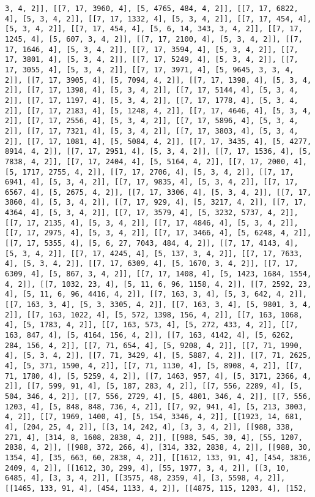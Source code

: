 \documentclass[12pt,fleqn]{article}\usepackage{../../common}
\begin{document}
\begin{verbatim}
3, 4, 2]], [[7, 17, 3960, 4], [5, 4765, 484, 4, 2]], [[7, 17, 6822, 4], [5, 3, 4, 2]], [[7, 17, 1332, 4], [5, 3, 4, 2]], [[7, 17, 454, 4], [5, 3, 4, 2]], [[7, 17, 454, 4], [5, 6, 14, 343, 3, 4, 2]], [[7, 17, 1245, 4], [5, 607, 3, 4, 2]], [[7, 17, 2100, 4], [5, 3, 4, 2]], [[7, 17, 1646, 4], [5, 3, 4, 2]], [[7, 17, 3594, 4], [5, 3, 4, 2]], [[7, 17, 3801, 4], [5, 3, 4, 2]], [[7, 17, 5249, 4], [5, 3, 4, 2]], [[7, 17, 3055, 4], [5, 3, 4, 2]], [[7, 17, 3971, 4], [5, 9645, 3, 3, 4, 2]], [[7, 17, 3905, 4], [5, 7094, 4, 2]], [[7, 17, 1398, 4], [5, 3, 4, 2]], [[7, 17, 1398, 4], [5, 3, 4, 2]], [[7, 17, 5144, 4], [5, 3, 4, 2]], [[7, 17, 1197, 4], [5, 3, 4, 2]], [[7, 17, 1778, 4], [5, 3, 4, 2]], [[7, 17, 2183, 4], [5, 1248, 4, 2]], [[7, 17, 4646, 4], [5, 3, 4, 2]], [[7, 17, 2556, 4], [5, 3, 4, 2]], [[7, 17, 5896, 4], [5, 3, 4, 2]], [[7, 17, 7321, 4], [5, 3, 4, 2]], [[7, 17, 3803, 4], [5, 3, 4, 2]], [[7, 17, 1081, 4], [5, 5084, 4, 2]], [[7, 17, 3435, 4], [5, 4277, 8914, 4, 2]], [[7, 17, 2951, 4], [5, 3, 4, 2]], [[7, 17, 1536, 4], [5, 7838, 4, 2]], [[7, 17, 2404, 4], [5, 5164, 4, 2]], [[7, 17, 2000, 4], [5, 1717, 2755, 4, 2]], [[7, 17, 2706, 4], [5, 3, 4, 2]], [[7, 17, 6941, 4], [5, 3, 4, 2]], [[7, 17, 9835, 4], [5, 3, 4, 2]], [[7, 17, 6567, 4], [5, 2675, 4, 2]], [[7, 17, 3306, 4], [5, 3, 4, 2]], [[7, 17, 3860, 4], [5, 3, 4, 2]], [[7, 17, 929, 4], [5, 3217, 4, 2]], [[7, 17, 4364, 4], [5, 3, 4, 2]], [[7, 17, 3579, 4], [5, 3232, 5737, 4, 2]], [[7, 17, 2135, 4], [5, 3, 4, 2]], [[7, 17, 4846, 4], [5, 3, 4, 2]], [[7, 17, 2975, 4], [5, 3, 4, 2]], [[7, 17, 3466, 4], [5, 6248, 4, 2]], [[7, 17, 5355, 4], [5, 6, 27, 7043, 484, 4, 2]], [[7, 17, 4143, 4], [5, 3, 4, 2]], [[7, 17, 4245, 4], [5, 137, 3, 4, 2]], [[7, 17, 7633, 4], [5, 3, 4, 2]], [[7, 17, 6309, 4], [5, 1670, 3, 4, 2]], [[7, 17, 6309, 4], [5, 867, 3, 4, 2]], [[7, 17, 1408, 4], [5, 1423, 1684, 1554, 4, 2]], [[7, 1032, 23, 4], [5, 11, 6, 96, 1158, 4, 2]], [[7, 2592, 23, 4], [5, 11, 6, 96, 4416, 4, 2]], [[7, 163, 3, 4], [5, 3, 642, 4, 2]], [[7, 163, 3, 4], [5, 3, 3305, 4, 2]], [[7, 163, 3, 4], [5, 9801, 3, 4, 2]], [[7, 163, 1022, 4], [5, 572, 1398, 156, 4, 2]], [[7, 163, 1068, 4], [5, 1783, 4, 2]], [[7, 163, 573, 4], [5, 272, 433, 4, 2]], [[7, 163, 847, 4], [5, 4164, 156, 4, 2]], [[7, 163, 4142, 4], [5, 6262, 284, 156, 4, 2]], [[7, 71, 654, 4], [5, 9208, 4, 2]], [[7, 71, 1990, 4], [5, 3, 4, 2]], [[7, 71, 3429, 4], [5, 5887, 4, 2]], [[7, 71, 2625, 4], [5, 371, 1590, 4, 2]], [[7, 71, 1130, 4], [5, 8908, 4, 2]], [[7, 71, 1780, 4], [5, 5259, 4, 2]], [[7, 1463, 957, 4], [5, 3171, 2366, 4, 2]], [[7, 599, 91, 4], [5, 187, 283, 4, 2]], [[7, 556, 2289, 4], [5, 504, 346, 4, 2]], [[7, 556, 2729, 4], [5, 4801, 346, 4, 2]], [[7, 556, 1203, 4], [5, 848, 848, 736, 4, 2]], [[7, 92, 941, 4], [5, 213, 3003, 4, 2]], [[7, 1969, 1400, 4], [5, 154, 3346, 4, 2]], [[1923, 14, 681, 4], [204, 25, 4, 2]], [[3, 14, 242, 4], [3, 3, 4, 2]], [[988, 338, 271, 4], [314, 8, 1608, 2838, 4, 2]], [[988, 545, 30, 4], [55, 1207, 2838, 4, 2]], [[988, 372, 266, 4], [314, 332, 2838, 4, 2]], [[988, 30, 1354, 4], [35, 663, 60, 2838, 4, 2]], [[1612, 133, 91, 4], [454, 3836, 2409, 4, 2]], [[1612, 30, 299, 4], [55, 1977, 3, 4, 2]], [[3, 10, 6485, 4], [3, 3, 4, 2]], [[3575, 48, 2359, 4], [3, 5598, 4, 2]], [[1465, 133, 91, 4], [454, 1133, 4, 2]], [[4875, 115, 1203, 4], [152, 
\end{verbatim}
\end{document}

